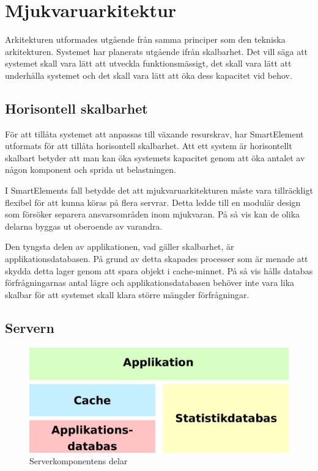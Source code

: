 \section{Mjukvaruarkitektur}

Arkitekturen utformades utgående från samma principer som den tekniska arkitekturen. Systemet har planerats utgående ifrån skalbarhet. Det vill säga att systemet skall vara lätt att utveckla funktionsmässigt, det skall vara lätt att underhålla systemet och det skall vara lätt att öka dess kapacitet vid behov. \citep[s. 203]{scalableweb}

\subsection{Horisontell skalbarhet}

För att tillåta systemet att anpassas till växande resurskrav, har SmartElement utformats för att tillåta horisontell skalbarhet. Att ett system är horisontellt skalbart betyder att man kan öka systemets kapacitet genom att öka antalet av någon komponent och sprida ut belastningen. \citep[s. 205-207]{scalableweb}

I SmartElements fall betydde det att mjukvaruarkitekturen måste vara tillräckligt flexibel för att kunna köras på flera servrar. Detta ledde till en modulär design som försöker separera ansvarsområden inom mjukvaran. På så vis kan de olika delarna byggas ut oberoende av varandra.

Den tyngsta delen av applikationen, vad gäller skalbarhet, är applikationsdatabasen. På grund av detta skapades processer som är menade att skydda detta lager genom att spara objekt i cache-minnet. På så vis hålls databas förfrågningarnas antal lägre och applikationsdatabasen behöver inte vara lika skalbar för att systemet skall klara större mängder förfrågningar.

\subsection{Servern}

\begin{figure}[h!]
\centering
\includegraphics[width=120mm]{assets/images/smelementbackendparts.png}
\caption{Serverkomponentens delar}
\label{abstractbackend}
\end{figure}

